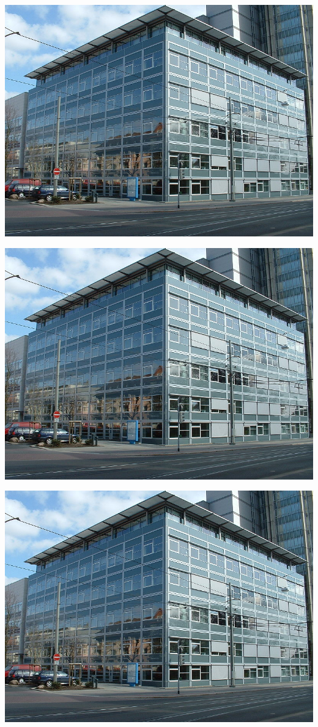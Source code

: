 \documentclass[a4paper,bcor=0mm,9pt,parskip=full,twoside]{tubsartcl}
\begin{document}
\begin{gaussbox}[bgcolor=tubsBlue20,innerpadding=none]{5}{2}{2}{1}
\includegraphics{infozentrum}
\end{gaussbox}
%
\begin{gaussbox}[bgcolor=tubsGray20,padding=default]{1}{3}{2}{1}
\includegraphics{infozentrum}
\end{gaussbox}
\begin{gaussbox}[bgcolor=tubsGray20,padding=none]{3}{3}{2}{1}
\includegraphics{infozentrum}
\end{gaussbox}
\end{document}
